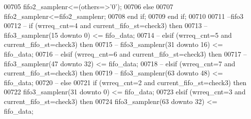\begin{DoxyCode}
00705               \textcolor{vhdlchar}{fifo2_samplenr}\textcolor{vhdlchar}{<=}\textcolor{vhdlchar}{(}\textcolor{keywordflow}{others}\textcolor{vhdlchar}{=}\textcolor{vhdlchar}{>}\textcolor{vhdlchar}{'}\textcolor{vhdllogic}{}\textcolor{vhdllogic}{0}\textcolor{vhdlchar}{'}\textcolor{vhdlchar}{)};
00706             \textcolor{keywordflow}{else}  
00707               \textcolor{vhdlchar}{fifo2_samplenr}\textcolor{vhdlchar}{<=}\textcolor{vhdlchar}{fifo2_samplenr};
00708             \textcolor{keywordflow}{end} \textcolor{keywordflow}{if};
00709           \textcolor{keywordflow}{end} \textcolor{keywordflow}{if};
00710             
00711 \textcolor{keyword}{          --fifo3                       }
00712 \textcolor{keyword}{--        if (wrreq\_cnt=4 and current\_fifo\_st=check3) then }
00713 \textcolor{keyword}{--          fifo3\_samplenr(15 downto 0) <= fifo\_data;}
00714 \textcolor{keyword}{--        elsif (wrreq\_cnt=5 and current\_fifo\_st=check3) then}
00715 \textcolor{keyword}{--          fifo3\_samplenr(31 downto 16) <= fifo\_data;}
00716 \textcolor{keyword}{--        elsif (wrreq\_cnt=6 and current\_fifo\_st=check3) then}
00717 \textcolor{keyword}{--          fifo3\_samplenr(47 downto 32) <= fifo\_data; }
00718 \textcolor{keyword}{--        elsif (wrreq\_cnt=7 and current\_fifo\_st=check3) then}
00719 \textcolor{keyword}{--          fifo3\_samplenr(63 downto 48) <= fifo\_data; }
00720 \textcolor{keyword}{--        else}
00721           \textcolor{keywordflow}{if} \textcolor{vhdlchar}{(}\textcolor{vhdlchar}{wrreq_cnt}\textcolor{vhdlchar}{=}\textcolor{vhdllogic}{}\textcolor{vhdllogic}{2} \textcolor{keywordflow}{and} \textcolor{vhdlchar}{current_fifo_st}\textcolor{vhdlchar}{=}\textcolor{vhdlchar}{check3}\textcolor{vhdlchar}{)} \textcolor{keywordflow}{then} 
00722             \textcolor{vhdlchar}{fifo3_samplenr}\textcolor{vhdlchar}{(}\textcolor{vhdllogic}{}\textcolor{vhdllogic}{31} \textcolor{keywordflow}{downto} \textcolor{vhdllogic}{}\textcolor{vhdllogic}{0}\textcolor{vhdlchar}{)} \textcolor{vhdlchar}{<=} \textcolor{vhdlchar}{fifo_data};
00723           \textcolor{keywordflow}{elsif} \textcolor{vhdlchar}{(}\textcolor{vhdlchar}{wrreq_cnt}\textcolor{vhdlchar}{=}\textcolor{vhdllogic}{}\textcolor{vhdllogic}{3} \textcolor{keywordflow}{and} \textcolor{vhdlchar}{current_fifo_st}\textcolor{vhdlchar}{=}\textcolor{vhdlchar}{check3}\textcolor{vhdlchar}{)} \textcolor{keywordflow}{then}
00724             \textcolor{vhdlchar}{fifo3_samplenr}\textcolor{vhdlchar}{(}\textcolor{vhdllogic}{}\textcolor{vhdllogic}{63} \textcolor{keywordflow}{downto} \textcolor{vhdllogic}{}\textcolor{vhdllogic}{32}\textcolor{vhdlchar}{)} \textcolor{vhdlchar}{<=} \textcolor{vhdlchar}{fifo_data}; 

\end{DoxyCode}
